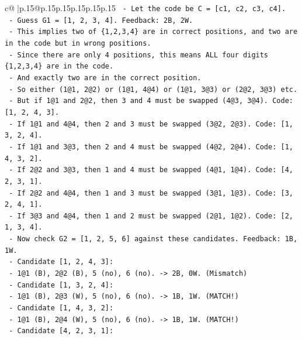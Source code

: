 \documentclass{article}
\begin{document}
{\begin{supertabular}{c@{$\;$}|p{.15\linewidth}@{}p{.15\linewidth}p{.15\linewidth}p{.15\linewidth}p{.15\linewidth}p{.15\linewidth}}
{{{\texttt{          {-} Let the code be C = {[}c1, c2, c3, c4{]}.} \\
\texttt{          {-} Guess G1 = {[}1, 2, 3, 4{]}. Feedback: 2B, 2W.} \\
\texttt{            {-} This implies two of \{1,2,3,4\} are in correct positions, and two are in the code but in wrong positions.} \\
\texttt{            {-} Since there are only 4 positions, this means ALL four digits \{1,2,3,4\} are in the code.} \\
\texttt{            {-} And exactly two are in the correct position.} \\
\texttt{            {-} So either (1@1, 2@2) or (1@1, 4@4) or (1@1, 3@3) or (2@2, 3@3) etc.} \\
\texttt{            {-} But if 1@1 and 2@2, then 3 and 4 must be swapped (4@3, 3@4). Code: {[}1, 2, 4, 3{]}.} \\
\texttt{            {-} If 1@1 and 4@4, then 2 and 3 must be swapped (3@2, 2@3). Code: {[}1, 3, 2, 4{]}.} \\
\texttt{            {-} If 1@1 and 3@3, then 2 and 4 must be swapped (4@2, 2@4). Code: {[}1, 4, 3, 2{]}.} \\
\texttt{            {-} If 2@2 and 3@3, then 1 and 4 must be swapped (4@1, 1@4). Code: {[}4, 2, 3, 1{]}.} \\
\texttt{            {-} If 2@2 and 4@4, then 1 and 3 must be swapped (3@1, 1@3). Code: {[}3, 2, 4, 1{]}.} \\
\texttt{            {-} If 3@3 and 4@4, then 1 and 2 must be swapped (2@1, 1@2). Code: {[}2, 1, 3, 4{]}.} \\
\texttt{          {-} Now check G2 = {[}1, 2, 5, 6{]} against these candidates. Feedback: 1B, 1W.} \\
\texttt{            {-} Candidate {[}1, 2, 4, 3{]}:} \\
\texttt{              {-} 1@1 (B), 2@2 (B), 5 (no), 6 (no). {-}> 2B, 0W. (Mismatch)} \\
\texttt{            {-} Candidate {[}1, 3, 2, 4{]}:} \\
\texttt{              {-} 1@1 (B), 2@3 (W), 5 (no), 6 (no). {-}> 1B, 1W. (MATCH!)} \\
\texttt{            {-} Candidate {[}1, 4, 3, 2{]}:} \\
\texttt{              {-} 1@1 (B), 2@4 (W), 5 (no), 6 (no). {-}> 1B, 1W. (MATCH!)} \\
\texttt{            {-} Candidate {[}4, 2, 3, 1{]}:} \\
}}}
\end{supertabular}}
\end{document}
